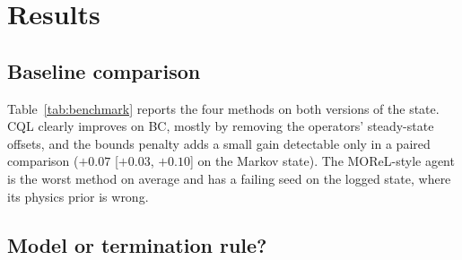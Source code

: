 \documentclass[11pt]{article}
\begin{document}
\section{Results}

\subsection{Baseline comparison}

Table~\ref{tab:benchmark} reports the four methods on both versions of the state. CQL clearly improves on BC, mostly by removing the operators' steady-state offsets, and the bounds penalty adds a small gain detectable only in a paired comparison ($+0.07$ [$+0.03$, $+0.10$] on the Markov state). The MOReL-style agent is the worst method on average and has a failing seed on the logged state, where its physics prior is wrong.

\begin{table}[h]
\centering\small
{}
\caption{Benchmark, ten seeds (0--9). Return over 200 steps, mean [95\% $t$-interval]; IQM is the interquartile mean over seeds (the mean of the middle six of ten), which a failing seed cannot drag down; a seed fails when its mean return is below $-10$. In cells with a failing seed the Return column gives the mean alone and the interval is on the IQM (bootstrap, Section~3).}
\label{tab:benchmark}
\end{table}

\subsection{Model or termination rule?}\label{sec:factorial}
\end{document}
